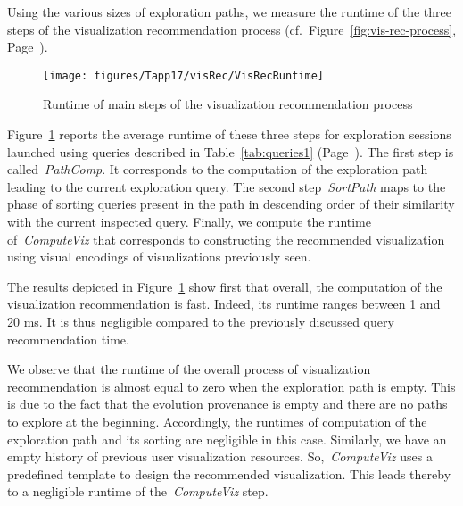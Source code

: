 Using the various sizes of exploration paths, we measure the runtime of the three steps of the visualization recommendation process (cf.~Figure~\ref{fig:vis-rec-process}, Page~\pageref{fig:vis-rec-process}). %


\begin{figure}[b]
\centering
\texttt{[image: figures/Tapp17/visRec/VisRecRuntime]}
\caption{Runtime of main steps of the visualization recommendation process}
\label{fig:vis-rec-runtime}
\end{figure}



Figure~\ref{fig:vis-rec-runtime} reports the average runtime of these three steps for exploration sessions launched using queries described in Table~\ref{tab:queries1} (Page~\pageref{tab:queries1}).
The first step is called~\emph{PathComp}. It corresponds to the computation of the exploration path leading to the current exploration query.
The second step~\emph{SortPath} maps to the phase of sorting queries present in the path in descending order of their similarity with the current inspected query.
Finally, we compute the runtime of~\emph{ComputeViz} that corresponds to constructing the recommended visualization using visual encodings of visualizations previously seen.

The results depicted in Figure~\ref{fig:vis-rec-runtime} show first that overall, the computation of the visualization recommendation is fast.
Indeed, its runtime ranges between 1 and 20 ms. It is thus negligible compared to the previously discussed query recommendation time.

We observe that the runtime of the overall process of visualization recommendation is almost equal to zero when the exploration path is empty. This is due to the fact that the evolution provenance is empty and there are no paths to explore at the beginning. Accordingly, the runtimes of computation of the exploration path and its sorting are negligible in this case. Similarly, we have an empty history of previous user visualization resources. So,~\emph{ComputeViz} uses a predefined template to design the recommended visualization. This leads thereby to a negligible runtime of the~\emph{ComputeViz} step.


